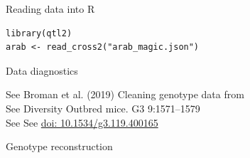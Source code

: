 \documentclass[12pt,t,aspectratio=1610]{beamer}
\begin{document}
\begin{frame}[fragile,c]{Reading data into R}


\begin{center} \begin{minipage}[c]{11.7cm} \begin{semiverbatim}
\lstset{basicstyle=\large}
\begin{lstlisting}[linewidth=11.7cm]
library(qtl2)
arab <- read_cross2("arab_magic.json")
\end{lstlisting}
\end{semiverbatim} \end{minipage} \end{center}



\end{frame}


\begin{frame}[c]{Data diagnostics}


\hfill \begin{minipage}{11.7cm}
{\lolit See} Broman et al. (2019) Cleaning genotype data from \\
{\color{background} See} Diversity Outbred mice. G3 9:1571--1579 \\[12pt]
{\color{background} See See} \href{https://doi.org/10.1534/g3.119.400165}{doi: 10.1534/g3.119.400165}
\end{minipage}

\end{frame}



\begin{frame}[c]{Genotype reconstruction}



\end{frame}
\end{document}
